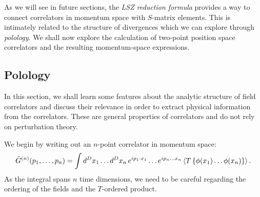 \documentclass{article}
\numberwithin{equation}{section}
\begin{document}
As we will see in future sections, the \textit{LSZ reduction formula} provides a way to connect correlators in momentum space with $S$-matrix elements. This is intimately related to the structure of divergences which we can explore through \textit{polology}. We shall now explore the calculation of two-point position space correlators and the resulting momentum-space expressions.


\subsection{Polology}

In this section, we shall learn some features about the analytic structure of field correlators and discuss their relevance in order to extract physical information from the correlators. These are general properties of correlators and do not rely on perturbation theory.

We begin by writing out an $n$-point correlator in momentum space:
\begin{equation}
    \tilde{G}^{(n)} (p_1, \dots, p_n) = \int d^Dx_1 \dots d^Dx_n \, e^{ip_1\cdot x_1} \dots e^{ip_n \dots x_n} \ev{T\left\{\phi(x_1) \dots \phi(x_n)\right\}}.
\end{equation}
As the integral spans $n$ time dimensions, we need to be careful regarding the ordering of the fields and the $T$-ordered product.
\end{document}

